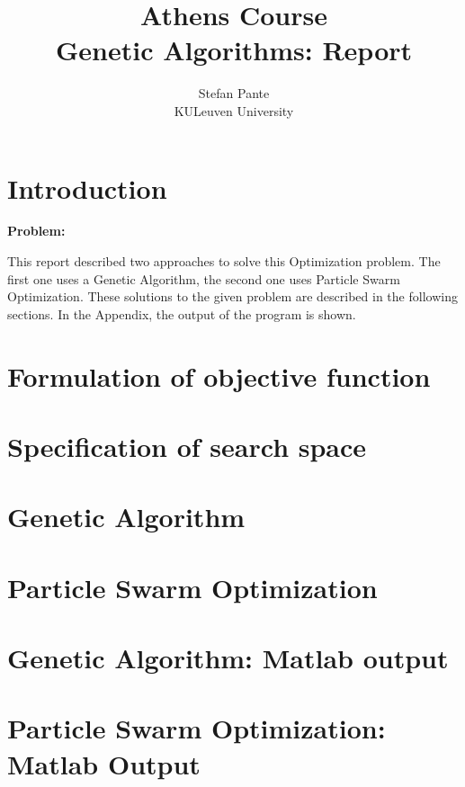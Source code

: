 \documentclass[10pt,a4paper]{article}
\title{Athens Course \\Genetic Algorithms: Report}
\author{Stefan Pante\\ KULeuven University}
\begin{document}
\begin{titlepage}
\maketitle
\tableofcontents
\end{titlepage}
\section{Introduction}
\textbf{Problem:}

This report described two approaches to solve this Optimization problem. The first one uses a Genetic Algorithm, the second one uses Particle Swarm Optimization. These solutions to the given problem are described in the following sections. In the Appendix, the output of the program is shown.
\section{Formulation of objective function}
\section{Specification of search space}
\section{Genetic Algorithm}
\section{Particle Swarm Optimization}
\appendix
\section{Genetic Algorithm: Matlab output}
\section{Particle Swarm Optimization: Matlab Output}
\end{document}
